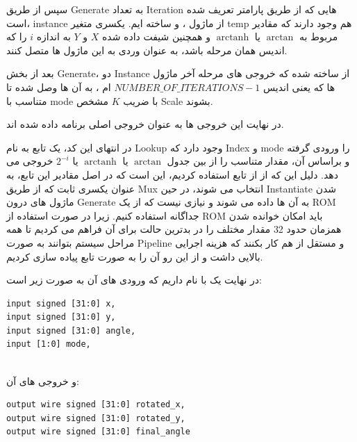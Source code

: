 \documentclass[12pt,titlepage,a4page , tikz , multi,table , svgnames,xcdraw]{article}
\DeclareMathOperator\arctanh{arctanh}
\begin{document}
سپس از طریق Generate به تعداد Iteration هایی که از طریق پارامتر تعریف شده است، instance از ماژول ،  و  ساخته ایم. یکسری متغیر temp هم وجود دارند که مقادیر مربوط به $\arctan$ یا $\arctanh$ و همچنین شیفت داده شده $X$ و $Y$ به اندازه $i$ را که اندیس همان مرحله باشد، به عنوان وردی به این ماژول ها متصل کنند.

بعد از بخش Generate، دو Instance از  ساخته شده که خروجی های مرحله آخر ماژول ها که یعنی اندیس
$NUMBER\_OF\_ITERATIONS - 1$
ام
 ،
   به آن ها وصل شده تا متناسب با mode با ضریب $K$ مشخص Scale بشوند.

در نهایت این خروجی ها به عنوان خروجی اصلی برنامه داده شده اند.

در انتهای این کد، یک تابع به نام Lookup وجود دارد که Index و mode را ورودی گرفته و براساس آن، مقدار متناسب را از بین جدول $\arctan$ یا $\arctanh$ یا $2^{-i}$ خروجی می دهد. دلیل این که از از تابع استفاده کردیم، این است که در اصل مقادیر این تابع، به عنوان یکسری ثابت که از طریق Mux انتخاب می شوند، در حین Instantiate شدن ماژول های درون Generate به آن ها داده می شوند و نیازی نیست که از یک ROM جداگانه استفاده کنیم. زیرا در صورت استفاده از ROM باید امکان خوانده شدن همزمان حدود 32 مقدار مختلف را در بدترین حالت برای آن فراهم می کردیم تا همه مراحل سیستم بتوانند به صورت Pipeline و مستقل از هم کار بکنند که هزینه اجرایی بالایی داشت و از این رو آن را به صورت تابع پیاده سازی کردیم.


\hrulefill

در نهایت یک  با نام  داریم که ورودی های آن به صورت زیر است:

\begin{latin}

\begin{verbatim}
input signed [31:0] x,
input signed [31:0] y,
input signed [31:0] angle,
input [1:0] mode,
   
\end{verbatim}

\end{latin}


و خروجی های آن:


\begin{latin}

\begin{verbatim}
output wire signed [31:0] rotated_x,
output wire signed [31:0] rotated_y,
output wire signed [31:0] final_angle
   
\end{verbatim}

\end{latin}
\end{document}
